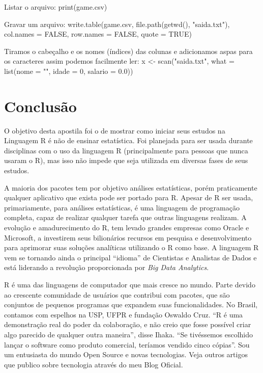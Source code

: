 \documentclass[a4paper,11pt]{article}
\begin{document}
Listar o arquivo:
{\ttfamily print(game.csv)}

Gravar um arquivo:
{\ttfamily write.table(game.csv, file.path(getwd(), "saida.txt"), col.names = FALSE, row.names = FALSE, quote = TRUE)}

Tiramos o cabeçalho e os nomes (índices) das colunas e adicionamos aspas para os caracteres assim podemos facilmente ler:
{\ttfamily x <- scan("saida.txt", what = list(nome = "", idade = 0, salario = 0.0))}

\section{Conclusão}
O objetivo desta apostila foi o de mostrar como iniciar seus estudos na Linguagem R é não de ensinar estatística. Foi planejada para ser usada durante disciplinas com o uso da linguagem R (principalmente para pessoas que nunca usaram o R), mas isso não impede que seja utilizada em diversas fases de seus estudos.

A maioria dos pacotes tem por objetivo análises estatísticas, porém praticamente qualquer aplicativo que exista pode ser portado para R. Apesar de R ser usada, primariamente, para análises estatísticas, é uma linguagem de programação completa, capaz de realizar qualquer tarefa que outras linguagens realizam. A evolução e amadurecimento do R, tem levado grandes empresas como Oracle e Microsoft, a investirem seus bilionários recursos em pesquisa e desenvolvimento para aprimorar suas soluções analíticas utilizando o R como base. A linguagem R vem se tornando ainda o principal ``idioma'' de Cientistas e Analistas de Dados e está liderando a revolução proporcionada por \textit{Big Data Analytics}.

R é uma das linguagens de computador que mais cresce no mundo. Parte devido ao crescente comunidade de usuários que contribui com pacotes, que são conjuntos de pequenos programas que expandem suas funcionalidades. No Brasil, contamos com espelhos na USP, UFPR e fundação Oswaldo Cruz. ``R é uma demonstração real do poder da colaboração, e não creio que fosse possível criar algo parecido de qualquer outra maneira'', disse Ihaka. ``Se tivéssemos escolhido lançar o software como produto comercial, teríamos vendido cinco cópias''. Sou um entusiasta do mundo Open Source e novas tecnologias. Veja outros artigos que publico sobre tecnologia através do meu Blog Oficial\cite{fernandoanselmo}.

\end{document}
